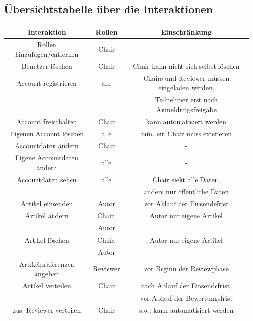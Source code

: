 \documentclass[headexclude,footexclude,12pt,BCOR0pt,DIV15]{scrartcl}
\begin{document}
    \subsection{\"{U}bersichtstabelle \"{u}ber die Interaktionen}
        \begin{tabular}{|c|c|c|}
          \hline
          \textbf{Interaktion} & \textbf{Rollen} & \textbf{Einschr\"{a}nkung} \\
          \hline
          \hline
          Rollen hinzuf\"{u}gen/entfernen & Chair & - \\
          \hline
          Benutzer l\"{o}schen & Chair & Chair kann nicht sich selbst l\"{o}schen \\
          \hline
          Account registrieren & alle & Chairs und Reviewer m\"{u}ssen eingeladen werden, \\
          & & Teilnehmer erst nach Anmeldungsfreigabe \\
          \hline
          Account freischalten & Chair & kann automatisiert werden \\
          \hline
          Eigenen Account l\"{o}schen & alle & min. ein Chair muss existieren \\
          \hline
          Accountdaten \"{a}ndern & Chair & - \\
          \hline
          Eigene Accountdaten \"{a}ndern & alle & - \\
          \hline
          Accountdaten sehen & alle & Chair sieht alle Daten, \\
           & & andere nur \"{o}ffentliche Daten \\
          \hline
          Artikel einsenden & Autor & vor Ablauf der Einsendefrist \\
          \hline
          Artikel \"{a}ndern & Chair, & Autor nur eigene Artikel \\
           & Autor & \\
          \hline
          Artikel l\"{o}schen & Chair, & Autor nur eigene Artikel \\
           & Autor & \\
          \hline
          Artikelpr\"{a}ferenzen angeben & Reviewer & vor Beginn der Reviewphase \\
          \hline
          Artikel verteilen & Chair & nach Ablauf der Einsendefrist, \\
           & & vor Ablauf der Bewertungsfrist \\
          \hline
          zus. Reviewer verteilen & Chair & s.o., kann automatisiert werden \\

\end{tabular}
\end{document}

